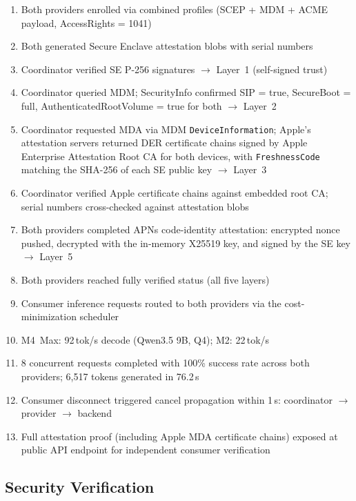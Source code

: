 \documentclass[10pt,twocolumn,letterpaper]{article}
\begin{document}
\begin{enumerate}[leftmargin=*,itemsep=1pt]
    \item Both providers enrolled via combined profiles (SCEP + MDM + ACME payload, AccessRights = 1041)
    \item Both generated Secure Enclave attestation blobs with serial numbers
    \item Coordinator verified SE P-256 signatures $\to$ Layer~1 (self-signed trust)
    \item Coordinator queried MDM; SecurityInfo confirmed SIP = true, SecureBoot = full, AuthenticatedRootVolume = true for both $\to$ Layer~2
    \item Coordinator requested MDA via MDM \texttt{DeviceInformation}; Apple's attestation servers returned DER certificate chains signed by Apple Enterprise Attestation Root CA for both devices, with \texttt{FreshnessCode} matching the SHA-256 of each SE public key $\to$ Layer~3
    \item Coordinator verified Apple certificate chains against embedded root CA; serial numbers cross-checked against attestation blobs
    \item Both providers completed APNs code-identity attestation: encrypted nonce pushed, decrypted with the in-memory X25519 key, and signed by the SE key $\to$ Layer~5
    \item Both providers reached fully verified status (all five layers)
    \item Consumer inference requests routed to both providers via the cost-minimization scheduler
    \item M4~Max: 92\,tok/s decode (Qwen3.5 9B, Q4); M2: 22\,tok/s
    \item 8 concurrent requests completed with 100\% success rate across both providers; 6,517 tokens generated in 76.2\,s
    \item Consumer disconnect triggered cancel propagation within 1\,s: coordinator $\to$ provider $\to$ backend
    \item Full attestation proof (including Apple MDA certificate chains) exposed at public API endpoint for independent consumer verification
\end{enumerate}

\subsection{Security Verification}
\end{document}
